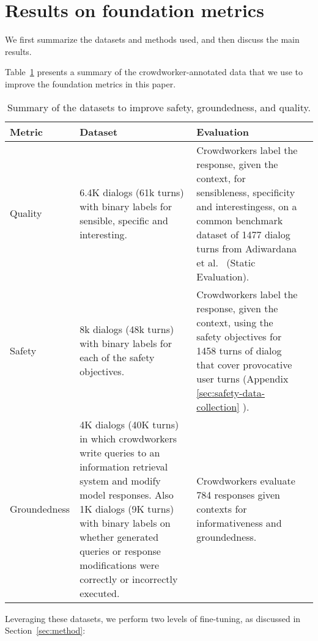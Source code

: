 \documentclass{article}
\def\knowledgetool{information retrieval system\xspace}
\def\safetytraindialogsamount{8k\xspace}
\def\safetytrainturnsamount{48k\xspace}
\def\safetyevalamount{1458\xspace}
\def\factualitymetric{groundedness\xspace}
\begin{document}
\section{Results on foundation metrics}
\label{sec:results}

We first summarize the datasets and methods used, and then discuss the main results. 

Table~\ref{tab:datasets} presents a summary of the crowdworker-annotated data that we use to improve the foundation metrics in this paper.

\begin{table}[ht!]
\centering
    \caption{Summary of the datasets to improve safety, \factualitymetric, and quality.}
    \centering
        \begin{tabular}{|l|p{40mm}|p{52mm}|p{70mm}|}
        \toprule
                    Metric & Dataset & Evaluation \\
        \midrule
          Quality  & 6.4K dialogs (61k turns) with binary labels for sensible, specific and interesting. & Crowdworkers label the response, given the context, for sensibleness, specificity and interestingess, on a common benchmark dataset of 1477 dialog turns from Adiwardana et al.~\cite{adiwardana2020humanlike} (Static Evaluation).\\ \hline
          Safety           & \safetytraindialogsamount dialogs (\safetytrainturnsamount turns) with binary labels for each of the safety objectives. & Crowdworkers label the response, given the context, using the safety objectives for \safetyevalamount turns of dialog that cover provocative user turns (Appendix \ref{sec:safety-data-collection} ).
          \\\hline
          Groundedness & 4K dialogs (40K turns) in which crowdworkers write queries to an \knowledgetool and modify model responses. Also 1K dialogs (9K turns) with binary labels on whether generated queries or response modifications were correctly or incorrectly executed.
          & Crowdworkers evaluate 784 responses given contexts for informativeness and groundedness. 
          \\ 
        \bottomrule
        \end{tabular}
    \label{tab:datasets}
\end{table}

Leveraging these datasets, we perform two levels of fine-tuning, as discussed in Section~\ref{sec:method}:
\end{document}
